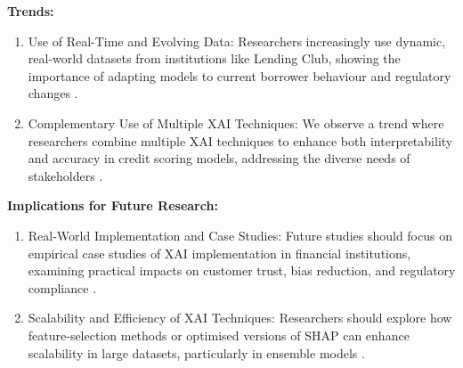 \documentclass[12pt,a4paper]{article}
\begin{document}
\textbf{Trends:}\\
\vspace{-3em}
\begin{enumerate}
    \item Use of Real-Time and Evolving Data: Researchers increasingly use dynamic, real-world datasets from institutions like Lending Club, showing the importance of adapting models to current borrower behaviour and regulatory changes \citep{misheva2021explainable} \citep{demajo2020explainable}.
    \item Complementary Use of Multiple XAI Techniques: We observe a trend where researchers combine multiple XAI techniques to enhance both interpretability and accuracy in credit scoring models, addressing the diverse needs of stakeholders \citep{demajo2020explainable}.
\end{enumerate}

\textbf{Implications for Future Research:}\\
\vspace{-3em}
\begin{enumerate}
    \item Real-World Implementation and Case Studies: Future studies should focus on empirical case studies of XAI implementation in financial institutions, examining practical impacts on customer trust, bias reduction, and regulatory compliance \citep{sadok2022artificial}.
    \item Scalability and Efficiency of XAI Techniques: Researchers should explore how feature-selection methods or optimised versions of SHAP can enhance scalability in large datasets, particularly in ensemble models \citep{TRIVEDI2020101413}.
\end{enumerate}



\end{document}
